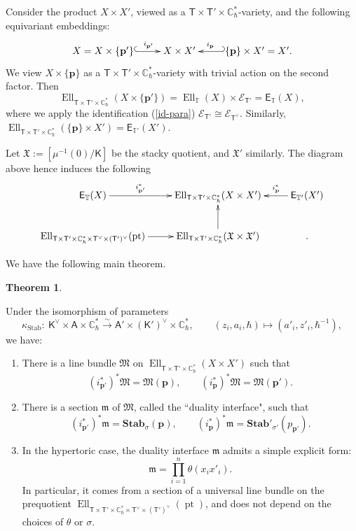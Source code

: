 \documentclass[10pt]{amsart}
\theoremstyle{definition}
\def\CC{{\mathbb{C}}}
\def\TT{\mathbb{T}}
\newcommand{\bp}{\mathbf{p}}
\newcommand{\cE}{\mathscr{E}}
\newcommand{\bStab}{\mathbf{Stab}}
\newcommand{\Ell}{\operatorname{Ell}}
\newcommand{\pt}{\operatorname{pt}}
\newcommand{\Stab}{\operatorname{Stab}}
\newcommand{\bA}{\mathsf{A}}
\newcommand{\bT}{\mathsf{T}}
\newcommand{\bK}{\mathsf{K}}
\theoremstyle{definition}
\numberwithin{equation}{section}
\theoremstyle{Theorem}
\newtheorem{Theorem}[Definition]{Theorem}
\begin{document}
Consider the product $X \times X'$, viewed as a $\bT \times \bT' \times \CC_\hbar^*$-variety, and the following equivariant embeddings:
$$
\xymatrix{
	X = X \times \{ \bp' \} \ar@{^{(}->}[r]^-{i_{\bp'}} & X \times X' & \{ \bp \} \times X' = X' \ar@{_{(}->}[l]_-{i_\bp} .
}
$$
We view $X\times \{\bp\}$ as a $\bT \times \bT' \times \CC_\hbar^*$-variety with trivial action on the second factor. Then
$$
\Ell_{\bT \times \bT' \times \CC_\hbar^*} (X \times \{ \bp' \} ) = \Ell_\TT (X) \times \cE_{\bT'} = \textsf{E}_\TT (X),
$$
where we apply the identification (\ref{id-para}) $\cE_{\bT'} \cong \cE_{\bT^\vee}$. Similarly, $\Ell_{\bT \times \bT' \times \CC_\hbar^*} (\{ \bp \} \times X' ) = \textsf{E}_{\TT'} (X')$.

Let $\mathfrak{X} := [\mu^{-1} (0) / \bK ]$ be the stacky quotient, and $\mathfrak{X}'$ similarly. The diagram above hence induces the following
$$
\xymatrix{
	\textsf{E}_\TT (X) \ar[r]^-{i_{\bp'}^*} & \Ell_{\bT \times \bT' \times \CC_\hbar^*} (X \times X') & \textsf{E}_{\TT'} (X') \ar[l]_-{i_{\bp}^*} \\
	\Ell_{\bT \times \bT' \times \CC_\hbar^* \times \bT^\vee \times (\bT')^\vee } (\pt) \ar[r] & \Ell_{\bT \times \bT' \times \CC_\hbar^*} (\mathfrak{X} \times \mathfrak{X}' ) \ar[u] & .
}
$$

We have the following main theorem.

\begin{Theorem} \label{Thm-Stab}
	
	Under the isomorphism of parameters
	$$
	\kappa_{\Stab}:  \ \bK^\vee \times \bA \times \CC^*_\hbar \xrightarrow{\sim} \bA' \times (\bK')^\vee \times \CC^*_\hbar, \qquad ( z_i , a_i, \hbar) \mapsto ( a'_i, z'_i,  \hbar^{-1}),
	$$
	we have:
	\begin{enumerate}[1)]
		
		\item There is a line bundle $\mathfrak{M}$ on $\Ell_{\bT \times \bT' \times \CC_\hbar^*} (X \times X')$ such that
		$$
		(i_{\bp'}^*)^* \mathfrak{M} = \mathfrak{M} (\bp) , \qquad (i_\bp^*)^* \mathfrak{M} = \mathfrak{M} (\bp').
		$$
		
		\item There is a section $\mathfrak{m}$ of $\mathfrak{M}$, called the ``duality interface", such that
		$$
		(i_{\bp'}^*)^* \mathfrak{m} = \bStab_{\sigma} (\bp) , \qquad (i_\bp^*)^* \mathfrak{m} = \bStab'_{\sigma'} (p_{\bp'}) .
		$$
		
		\item In the hypertoric case, the duality interface $\mathfrak{m}$ admits a simple explicit form:
		$$
		\mathfrak{m} = \prod_{i=1}^n \theta (x_i x'_i)  .
		$$
		In particular, it comes from a section of a universal line bundle on the prequotient $\Ell_{\bT \times \bT' \times \CC_\hbar^* \times \bT^\vee \times (\bT')^\vee} (\pt)$, and does not depend on the choices of $\theta$ or $\sigma$.
	\end{enumerate}
\end{Theorem}
\end{document}
